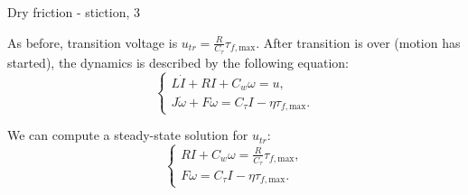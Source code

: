 \documentclass{beamer}
\begin{document}
\begin{frame}{Dry friction - stiction, 3}
	\begin{flushleft}
		
		As before, transition voltage is $u_{tr} = \frac{R}{C_\tau} \tau_{f, \text{max}}$. After transition is over (motion has started), the dynamics is described by the following equation:
		\begin{equation}
			\begin{cases}
				L \dot I + RI + C_w \omega = u,
				\\
				J \dot   \omega + F \omega = C_\tau I - \eta \tau_{f, \text{max}}. 
			\end{cases}
		\end{equation}
		
		We can compute a steady-state solution for $u_{tr}$:
		\begin{equation}
			\begin{cases}
				RI + C_w \omega = \frac{R}{C_\tau} \tau_{f, \text{max}},
				\\
				F \omega = C_\tau I - \eta \tau_{f, \text{max}}. 
			\end{cases}
		\end{equation}
		
		
	\end{flushleft}
\end{frame}
\end{document}
